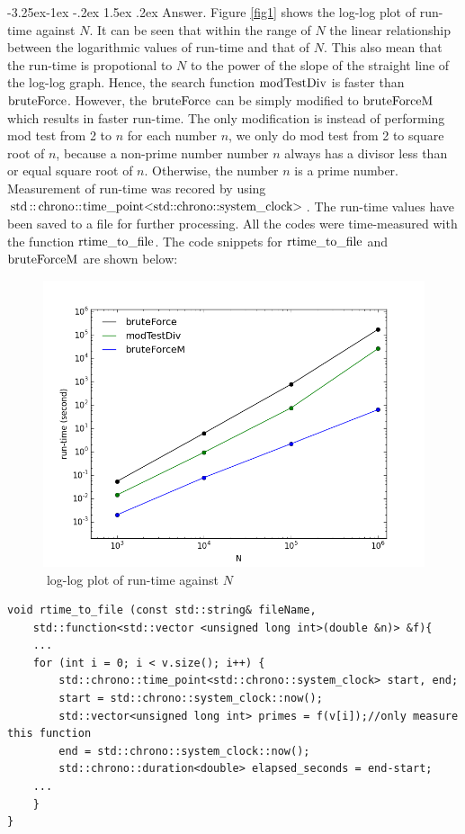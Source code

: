 \documentclass[a4paper,12pt]{article}%
\makeatletter
\renewcommand\subsubsection{\@startsection{subsection}{2}{\z@}%
                                     {-3.25ex\@plus -1ex \@minus -.2ex}%
                                     {1.5ex \@plus .2ex}%
                                     {\normalfont\bfseries\itshape}}%
\makeatother
\begin{document}
\subsubsection{Answer.}
Figure \eqref{fig1} shows the log-log plot of run-time against $N$. It can be seen that within the range of $N$ the linear relationship between the logarithmic values of run-time and that of $N$. This also mean that the run-time is propotional to $N$ to the power of the slope of the straight line of the log-log graph. Hence, the search function $\lstinline{modTestDiv}$ is faster than $\lstinline{bruteForce}$. However, the $\lstinline{bruteForce}$ can be simply modified to $\lstinline{bruteForceM}$ which results in faster run-time. The only modification is instead of performing mod test from 2 to $n$ for each number $n$, we only do mod test from 2 to square root of $n$, because a non-prime number number $n$ always has a divisor less than or equal square root of $n$. Otherwise, the number $n$ is a prime number. Measurement of run-time was recored by using $\lstinline{std::chrono::time_point<std::chrono::system_clock>}$. The run-time values have been saved to a file for further processing. All the codes were time-measured with the function $\lstinline{rtime_to_file}$. The code snippets for  $\lstinline{rtime_to_file}$ and $\lstinline{bruteForceM}$  are shown below:
\begin{figure}[h]
\centering
\includegraphics[width=0.8\linewidth, height=0.5\linewidth]{rt-vs-n.png}
\caption{log-log plot of run-time against $N$}
\label{fig1}
\end{figure}
\begin{lstlisting}[title = $\lstinline{rtime_to_file}$]
void rtime_to_file (const std::string& fileName, 
    std::function<std::vector <unsigned long int>(double &n)> &f){    
 	...
    for (int i = 0; i < v.size(); i++) {
        std::chrono::time_point<std::chrono::system_clock> start, end;
        start = std::chrono::system_clock::now();
        std::vector<unsigned long int> primes = f(v[i]);//only measure this function
        end = std::chrono::system_clock::now();
        std::chrono::duration<double> elapsed_seconds = end-start;
 	...    
    }
}
\end{lstlisting}
\end{document}
